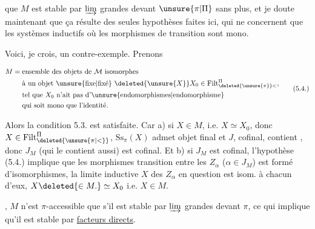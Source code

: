 
 que $M$ est stable par $\varinjlim$ grandes devant $\unsure{\pi|\Pi}$ sans plus, et je doute maintenant que ça résulte des seules hypothèses faites ici, qui ne concernent que les systèmes inductifs où les morphismes de transition sont mono.

Voici, je crois, un contre-exemple. Prenons

\[
\begin{aligned}
 M={}&\text{ensemble des objets de $\mathcal M$ isomorphes}\\
 &\text{à un objet \unsure{fixe|fixé} $\deleted{\unsure{X}}X_0\in\mathrm{Filt}^{\Pi}_{\deleted{\unsure{\pi}}<}$,}\\
 &\text{tel que $X_0$ n'ait pas d'\unsure{endomorphismes|endomorphisme}}\\
 &\text{qui soit mono que l'identité.}
\end{aligned}\tag*{(5.4.)}
\]

Alors la condition 5.3. est satisfaite. Car 
a) si $X\in M$, i.e. $X\simeq X_0$, donc $X\in\mathrm{Filt}^{\Pi}_{\deleted{\unsure{\pi|<}}}$, 
$\mathrm{Ss}_{\pi}(X)$ admet   objet final et $J$,  cofinal, contient  , donc $J_M$ (qui le contient aussi) est cofinal. Et b) si $J_M$ est cofinal,  l'hypothèse (5.4.) implique que les morphismes  transition  entre les $Z_\alpha$ ($\alpha\in J_M$) est formé d'isomorphismes,  la limite inductive $X$ des $Z_\alpha$ en question est isom. à chacun d'eux,  $X\deleted{\in M.}\simeq X_0$ i.e. $X\in M$.

, $M$ n'est $\pi$-accessible que s'il est stable par $\varinjlim$ grandes devant $\pi$, ce qui implique qu'il est stable par \uline{facteurs directs}. 

